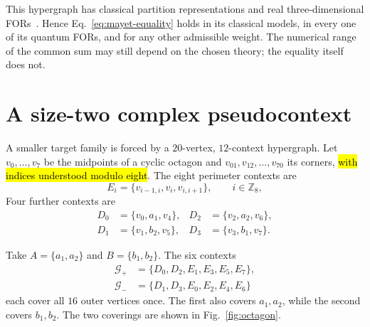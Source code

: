 \documentclass[
  twocolumn,
  aps,
  pra,
  floatfix,
  amsmath,amssymb,
  longbibliography
]{revtex4-2}
\theoremstyle{definition}
\theoremstyle{remark}
\newcommand{\corr}[1]{{\color{red}\hl{#1}}}
\begin{document}
This hypergraph has classical partition representations and real
three-dimensional FORs~\cite{2023-navara-svozil}.  Hence
Eq.~\eqref{eq:mayet-equality} holds in its classical models, in every one of
its quantum FORs, and for any other admissible weight.
The numerical range of the common sum may still depend on the chosen theory;
the equality itself does not.

\section{A size-two complex pseudocontext}
\label{sec:octagon}

A smaller target family is forced by a $20$-vertex, $12$-context hypergraph.  Let
$v_0,\ldots,v_7$ be the midpoints of a cyclic octagon and
$v_{01},v_{12},\ldots,v_{70}$ its corners, \corr{with indices understood modulo eight}.
The
eight perimeter contexts are
\begin{equation}
 E_i=\{v_{i-1,i},v_i,v_{i,i+1}\},\qquad i\in\mathbb Z_8,
 \label{eq:octagon-perimeter}
\end{equation}
Four further contexts are
\begin{align}
 D_0&=\{v_0,a_1,v_4\},&D_2&=\{v_2,a_2,v_6\},\nonumber\\
 D_1&=\{v_1,b_2,v_5\},&D_3&=\{v_3,b_1,v_7\}.
 \label{eq:octagon-inner}
\end{align}

Take $A=\{a_1,a_2\}$ and $B=\{b_1,b_2\}$.  The six contexts
\begin{align}
 \mathcal G_+&=\{D_0,D_2,E_1,E_3,E_5,E_7\},\nonumber\\
 \mathcal G_-&=\{D_1,D_3,E_0,E_2,E_4,E_6\}
 \label{eq:octagon-covers}
\end{align}
each cover all $16$ outer vertices once.  The first also covers $a_1,a_2$,
while the second covers $b_1,b_2$.  The two coverings are shown in
Fig.~\ref{fig:octagon}.
\end{document}
